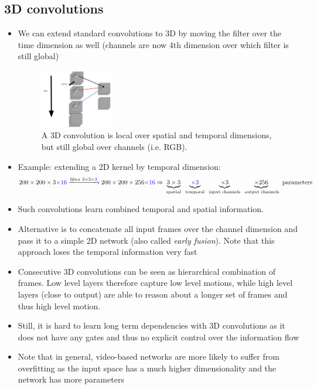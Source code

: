 \subsection{3D convolutions}
\begin{itemize}
	\item We can extend standard convolutions to 3D by moving the filter over the time dimension as well (channels are now 4th dimension over which filter is still global)
	\begin{figure}[ht!]
		\centering
		\includegraphics[width=0.3\textwidth]{figures/cv_deep_video_3D_convs.png}
		\caption{A 3D convolution is local over spatial and temporal dimensions, but still global over channels (i.e. RGB).}
		\label{fig:deep_video_3d_convs}
	\end{figure}
	\item Example: extending a 2D kernel by temporal dimension:
	\begin{equation*}
		\begin{split}
			200\times 200\times 3 \textcolor{blue}{\times 16} \xrightarrow{\text{filter }3\times3\textcolor{blue}{\times 3}} 200\times 200\times 256 \textcolor{blue}{\times 16}
			\Rightarrow \underbrace{3\times 3}_{\text{ spatial }}\underbrace{\textcolor{blue}{\times 3}}_{\text{ temporal }}\underbrace{\times 3}_{\text{ input channels }}\underbrace{\times 256}_{\text{ output channels}}\text{ parameters}
		\end{split}
	\end{equation*}
	\item Such convolutions learn combined temporal and spatial information. 
	\item Alternative is to concatenate all input frames over the channel dimension and pass it to a simple 2D network (also called \textit{early fusion}). Note that this approach loses the temporal information very fast
	\item Consecutive 3D convolutions can be seen as hierarchical combination of frames. Low level layers therefore capture low level motions, while high level layers (close to output) are able to reason about a longer set of frames and thus high level motion.
	\item Still, it is hard to learn long term dependencies with 3D convolutions as it does not have any gates and thus no explicit control over the information flow
	\item Note that in general, video-based networks are more likely to suffer from overfitting as the input space has a much higher dimensionality and the network has more parameters
\end{itemize}
